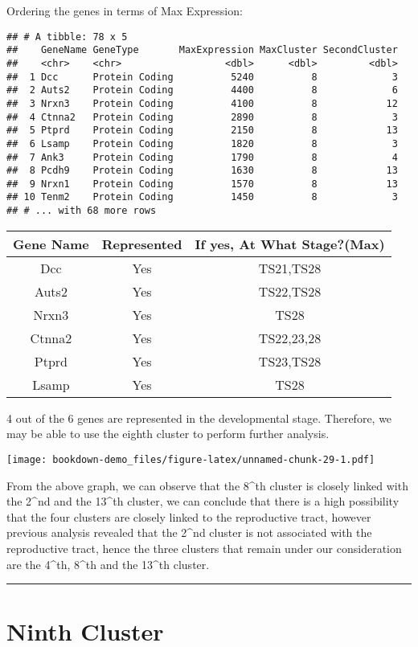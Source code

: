 \documentclass[
]{book}
\begin{document}
Ordering the genes in terms of Max Expression:

\begin{verbatim}
## # A tibble: 78 x 5
##    GeneName GeneType       MaxExpression MaxCluster SecondCluster
##    <chr>    <chr>                  <dbl>      <dbl>         <dbl>
##  1 Dcc      Protein Coding          5240          8             3
##  2 Auts2    Protein Coding          4400          8             6
##  3 Nrxn3    Protein Coding          4100          8            12
##  4 Ctnna2   Protein Coding          2890          8             3
##  5 Ptprd    Protein Coding          2150          8            13
##  6 Lsamp    Protein Coding          1820          8             3
##  7 Ank3     Protein Coding          1790          8             4
##  8 Pcdh9    Protein Coding          1630          8            13
##  9 Nrxn1    Protein Coding          1570          8            13
## 10 Tenm2    Protein Coding          1450          8             3
## # ... with 68 more rows
\end{verbatim}

\begin{longtable}[]{@{}ccc@{}}
\toprule
Gene Name & Represented & If yes, At What Stage?(Max)\tabularnewline
\midrule
\endhead
Dcc & Yes & TS21,TS28\tabularnewline
Auts2 & Yes & TS22,TS28\tabularnewline
Nrxn3 & Yes & TS28\tabularnewline
Ctnna2 & Yes & TS22,23,28\tabularnewline
Ptprd & Yes & TS23,TS28\tabularnewline
Lsamp & Yes & TS28\tabularnewline
\bottomrule
\end{longtable}

4 out of the 6 genes are represented in the developmental stage. Therefore, we may be able to use the eighth cluster to perform further analysis.

\texttt{[image: bookdown-demo\_files/figure-latex/unnamed-chunk-29-1.pdf]}

From the above graph, we can observe that the 8\^{}th cluster is closely linked with the 2\^{}nd and the 13\^{}th cluster, we can conclude that there is a high possibility that the four clusters are closely linked to the reproductive tract, however previous analysis revealed that the 2\^{}nd cluster is not associated with the reproductive tract, hence the three clusters that remain under our consideration are the 4\^{}th, 8\^{}th and the 13\^{}th cluster.

\begin{center}\rule{0.5\linewidth}{0.5pt}\end{center}

\hypertarget{ninth-cluster}{%
\chapter{Ninth Cluster}\label{ninth-cluster}}
\end{document}
